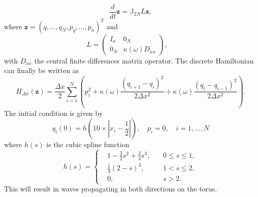 \begin{equation} \label{eq:NuRe:5}
	\frac{d}{dt} \mathbf z = \mathbb{J}_{2N} L\mathbf z,
\end{equation}
where $\mathbf z=(q,\dots,q_N,p_q,\dots,p_n)^T$ and
\begin{equation} \label{eq:NuRe:6}
L = 
\begin{pmatrix}
	I_n & 0_N \\
	0_N & \kappa(\omega)D_{xx}
\end{pmatrix},\quad 
\end{equation}
with $D_{xx}$ the central finite differences matrix operator. The discrete Hamiltonian can finally be written as
\begin{equation} \label{eq:NuRe:7}
	H_{\Delta x}(\mathbf z) = \frac{\Delta x}2 \sum_{i=1}^{N} \left( p_i^2 + \kappa(\omega) \frac{(q_{i+1} - q_i)^2}{2\Delta x ^ 2} + \kappa(\omega) \frac{(q_{i} - q_{i-1})^2}{2\Delta x ^ 2} \right).
\end{equation}
The initial condition is given by
\begin{equation} \label{eq:NuRe:8}
	q_i(0) = h( 10\times|x_i - \frac{1}{2}| ), \quad p_i = 0, \quad i=1,\dots,N
\end{equation}
where $h(s)$ is the cubic spline function
\begin{equation} \label{eq:NuRe:9}
h(s) = 
\left\{
\begin{aligned}
& 1 - \frac{3}{2}s^2 + \frac{3}{4}s^3, \quad & 0\leq s \leq 1, \\
& \frac{1}{4}(2-s)^3, & 1< s \leq 2, \\
& 0, & s > 2.
\end{aligned}
\right.
\end{equation}
This will result in waves propagating in both directions on the torus.

